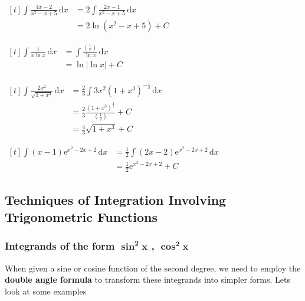 \documentclass[11pt,a4paper]{book}
\begin{document}
\begin{example}
\begin{tasks}[label=(\alph*),label-width=3.5ex,after-item-skip = 1cm]
\task
$
\begin{aligned}[t]
{\displaystyle {\displaystyle \int\frac{4x-2}{x^{2}-x+5}\, \mathrm{d}x}} & =2{\displaystyle \int\frac{2x-1}{x^{2}-x+5}\, \mathrm{d}x}\\
 & =2\ln\left(x^{2}-x+5\right)+C
\end{aligned}
$

\task
$
\begin{aligned}[t]
{\displaystyle \int\frac{1}{x\ln x}\, \mathrm{d}x} & =\int\frac{\left(\frac{1}{x}\right)}{\ln x}\, \mathrm{d}x\\
 & =\ln\left|\ln x\right|+C
\end{aligned}
$

\task
$
\begin{aligned}[t]
{\displaystyle \int\frac{2x^{2}}{\sqrt{1+x^{3}}}\, \mathrm{d}x} & ={\displaystyle \frac{2}{3}\int3x^{2}(1+x^{3})^{-\frac{1}{2}}\, \mathrm{d}x}\\
 & =\frac{2}{3}\frac{\left(1+x^{3}\right)^{\frac{1}{2}}}{\left(\frac{1}{2}\right)}+C\\
 & =\frac{4}{3}\sqrt{1+x^{3}}+C
\end{aligned}
$

\task
$
\begin{aligned}[t]
{\displaystyle \int(x-1)\mathrm{e}^{x^{2}-2x+2}\, \mathrm{d}x} & =\frac{1}{2}\int(2x-2)\mathrm{e}^{x^{2}-2x+2}\, \mathrm{d}x\\
 & =\frac{1}{2}\mathrm{e}^{x^{2}-2x+2}+C
\end{aligned}
$

\end{tasks}

\end{example}


\newpage

\subsection{Techniques of Integration Involving Trigonometric Functions}

\subsubsection{Integrands of the form $\boldsymbol{\sin^{2}x}$ , $\boldsymbol{\cos^{2}x}$}

When given a sine or cosine function of the second degree, we need
to employ the \textbf{double angle formula }to transform these integrands
into simpler forms. Lets look at some examples
\end{document}
